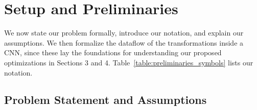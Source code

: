 \section{Setup and Preliminaries}\label{sec:preliminaries}
We now state our problem formally, introduce our notation, and explain our assumptions.
We then formalize the dataflow of the transformations inside a CNN, since these lay the foundations for understanding our proposed optimizations in Sections 3 and 4.
Table~\ref{table:preliminaries_symbols} lists our notation.

\subsection{Problem Statement and Assumptions}\label{sec:problem}

